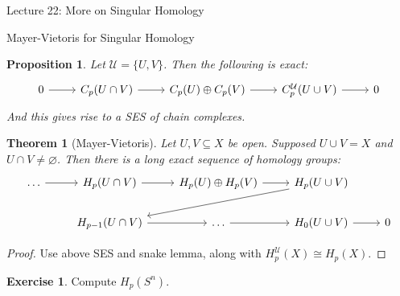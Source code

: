 \documentclass[10pt]{article}
\theoremstyle{plain}
\newtheorem{theorem}{Theorem}[section]
\newtheorem{prop}[thm]{Proposition}
\theoremstyle{definition}
\newtheorem{exercise}[thm]{Exercise}
\newcommand{\chartU}{\mathcal{U}}
\begin{document}
\begin{section}{Lecture 22: More on Singular Homology}
\begin{subsection}{Mayer-Vietoris for Singular Homology}
\begin{prop}
    Let $\chartU = \{U, V\}$. Then the following is exact:
    $$%
\begin{tikzcd}
0 \arrow[r] & C_p(U\cap V) \arrow[r] & C_p(U)\oplus C_p(V) \arrow[r] & C_p^{\mathcal{U}}(U\cup V) \arrow[r] & 0
\end{tikzcd}$$
And this gives rise to a SES of chain complexes.
\end{prop}

\begin{theorem}[Mayer-Vietoris]
    Let $U,V \subseteq X$ be open. Supposed $U\cup V = X$ and $U\cap V \neq \varnothing$. Then there is a long exact sequence of homology groups:
    $$%
\begin{tikzcd}
\ldots \arrow[r] & H_p(U\cap V) \arrow[r]     & H_p(U) \oplus H_p(V) \arrow[r] & H_p(U\cup V) \arrow[lld] &   \\
                 & H_{p-1}(U\cap V) \arrow[r] & \ldots \arrow[r]               & H_{0}(U\cup V) \arrow[r] & 0
\end{tikzcd}$$
\end{theorem}
\begin{proof}
    Use above SES and snake lemma, along with $H^\chartU_p(X) \cong H_p(X)$.
\end{proof}

\begin{exercise}
    Compute $H_p(S^n)$.
\end{exercise}
\end{subsection}
\end{section}
\end{document}
